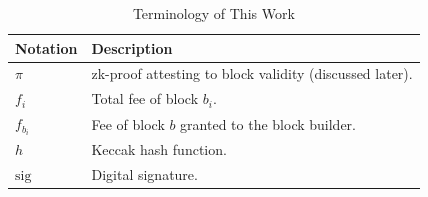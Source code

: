 \begin{table}[h!]
\centering
\caption{Terminology of This Work}
\label{table:work_terminology}
\begin{tabular}{ll}
\hline
\textbf{Notation} & \textbf{Description} \\
\hline
$\pi$ & zk-proof attesting to block validity (discussed later). \\
$f_{i}$ & Total fee of block $b_{i}$. \\
$f_{b_{i}}$ & Fee of block $b$ granted to the block builder. \\
$h$ & Keccak hash function. \\
$\mathrm{sig}$ & Digital signature. \\
\hline
\end{tabular}
\end{table}



